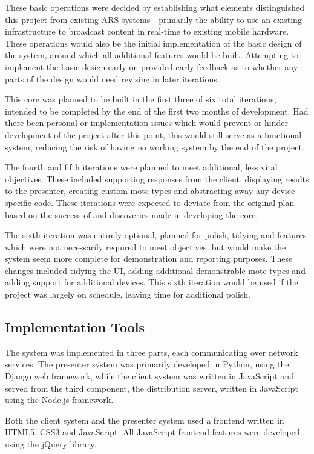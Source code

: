 \documentclass[a4papert,11pt,notitlepage]{article}
\begin{document}
These basic operations were decided by establishing what elements distinguished this project from existing ARS systems - primarily the ability to use an existing infrastructure to broadcast content in real-time to existing mobile hardware. These operations would also be the initial implementation of the basic design of the system, around which all additional features would be built. Attempting to implement the basic design early on provided early feedback as to whether any parts of the design would need revising in later iterations.

This core was planned to be built in the first three of six total iterations, intended to be completed by the end of the first two months of development. Had there been personal or implementation issues which would prevent or hinder development of the project after this point, this would still serve as a functional system, reducing the risk of having no working system by the end of the project.

The fourth and fifth iterations were planned to meet additional, less vital objectives. These included supporting responses from the client, displaying results to the presenter, creating custom mote types and abstracting away any device-specific code. These iterations were expected to deviate from the original plan based on the success of and discoveries made in developing the core.

The sixth iteration was entirely optional, planned for polish, tidying and features which were not necessarily required to meet objectives, but would make the system seem more complete for demonstration and reporting purposes. These changes included tidying the UI, adding additional demonstrable mote types and adding support for additional devices. This sixth iteration would be used if the project was largely on schedule, leaving time for additional polish.

\subsection{Implementation Tools}
The system was implemented in three parts, each communicating over network services. The presenter system was primarily developed in Python\cite{python:web}, using the Django\cite{django:web} web framework, while the client system was written in JavaScript and served from the third component, the distribution server, written in JavaScript using the Node.js\cite{nodejs:web} framework.

Both the client system and the presenter system used a frontend written in HTML5, CSS3 and JavaScript. All JavaScript frontend features were developed using the jQuery\cite{jquery:web} library.
\end{document}
